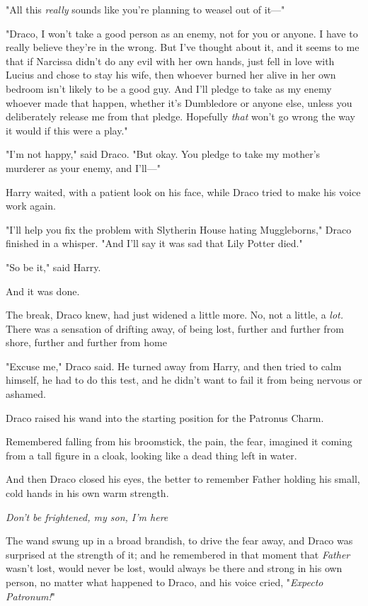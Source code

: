 "All this \emph{really} sounds like you're planning to weasel out of it\mbox{---}"

"Draco, I won't take a good person as an enemy, not for you or anyone. I have
to really believe they're in the wrong. But I've thought about it, and it seems
to me that if Narcissa didn't do any evil with her own hands, just fell in love
with Lucius and chose to stay his wife, then whoever burned her alive in her
own bedroom isn't likely to be a good guy. And I'll pledge to take as my enemy
whoever made that happen, whether it's Dumbledore or anyone else, unless you
deliberately release me from that pledge. Hopefully \emph{that} won't go wrong
the way it would if this were a play."

"I'm not happy," said Draco. "But okay. You pledge to take my mother's murderer
as your enemy, and I'll\mbox{---}"

Harry waited, with a patient look on his face, while Draco tried to make his
voice work again.

"I'll help you fix the problem with Slytherin House hating Muggleborns," Draco
finished in a whisper. "And I'll say it was sad that Lily Potter died."

"So be it," said Harry.

And it was done.

The break, Draco knew, had just widened a little more. No, not a little, a
\emph{lot.} There was a sensation of drifting away, of being lost, further and
further from shore, further and further from home{\el}

"Excuse me," Draco said. He turned away from Harry, and then tried to calm
himself, he had to do this test, and he didn't want to fail it from being
nervous or ashamed.

Draco raised his wand into the starting position for the Patronus Charm.

Remembered falling from his broomstick, the pain, the fear, imagined it coming
from a tall figure in a cloak, looking like a dead thing left in water.

And then Draco closed his eyes, the better to remember Father holding his
small, cold hands in his own warm strength.

\emph{Don't be frightened, my son, I'm here{\el}}

The wand swung up in a broad brandish, to drive the fear away, and Draco was
surprised at the strength of it; and he remembered in that moment that
\emph{Father} wasn't lost, would never be lost, would always be there and
strong in his own person, no matter what happened to Draco, and his voice
cried, "\emph{Expecto Patronum!}"

